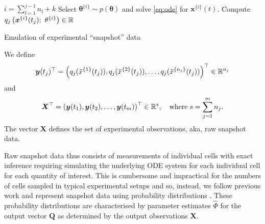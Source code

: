 \begin{algorithm}[H]
\label{alg:simulate}
\footnotesize
\texttt{\\}
\begin{algorithmic}
            \State $i=\sum_{l=1}^{j-1} n_l + k$
            \State Select $\boldsymbol{\theta}^{\{i\}} \sim p(\boldsymbol{\theta})$ and solve \eqref{eq:ode} for $\boldsymbol{x}^{\{i\}}(t)$.
            \State Compute $q_j\left( \boldsymbol{x}^{\{i\}}(t_j); \ \theta^{\{i\}} \right) \in \mathbb{R}$
        \EndFor
\EndFor
\end{algorithmic}
\caption{Emulation of experimental ``snapshot'' data}
\end{algorithm}
We define
\begin{equation}
\boldsymbol{y}(t_j)^\top = \left( q_j(\tilde x^{\{1\}}(t_j)), q_j(\tilde x^{\{2\}}(t_j)), \dots, q_j(\tilde x^{\{n_j\}}(t_j))  \right)^\top  \in \mathbb{R}^{n_j}
\end{equation}
and
\begin{equation}
  \boldsymbol{X}^\top = \left( \boldsymbol{y}(t_1), \boldsymbol{y}(t_2), \dots, \boldsymbol{y}(t_m) \right)^\top \in \mathbb{R}^s,
                        \quad \hbox{where} \; s = \sum_{j=1}^m n_j.
\end{equation}
The vector $\boldsymbol{X}$ defines the set of experimental observations, aka, raw snapshot data.

Raw snapshot data thus consists of measurements of individual cells with exact inference requiring simulating the underlying ODE system for each individual cell for each quantity of interest. This is cumbersome and impractical for the numbers of cells sampled in typical experimental setups and so, instead, we follow previous work and represent snapshot data using probability distributions \cite{hasenauer2011identification,hasenauer2014ode,loos2018hierarchical,dixit2018maximum}.
These probability distributions are characterised by parameter estimates $\hat{\Phi}$ for the output vector $\boldsymbol{Q}$ as determined by the output observations $\boldsymbol{X}$.

